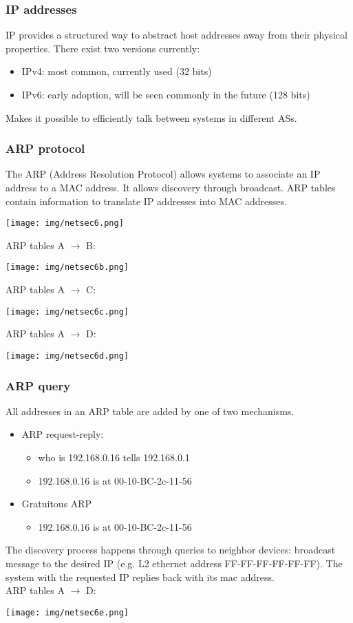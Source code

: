\documentclass[a4paper, 10pt, titlepage]{article}
\begin{document}
\subsubsection*{IP addresses}
IP provides a structured way to abstract host addresses away from their physical properties. There exist two versions currently:
\begin{itemize}
\item IPv4: most common, currently used (32 bits)
\item IPv6: early adoption, will be seen commonly in the future (128 bits)
\end{itemize}
Makes it possible to efficiently talk between systems in different ASs.

\subsubsection*{ARP protocol}
The ARP (Address Resolution Protocol) allows systems to associate an IP address to a MAC address. It allows discovery through broadcast. ARP tables contain information to translate IP addresses into MAC addresses.
\begin{center}
	\texttt{[image: img/netsec6.png]}
\end{center}
ARP tables A $\rightarrow$ B:
\begin{center}
	\texttt{[image: img/netsec6b.png]}
\end{center}
ARP tables A $\rightarrow$ C:
\begin{center}
	\texttt{[image: img/netsec6c.png]}
\end{center}
ARP tables A $\rightarrow$ D:
\begin{center}
	\texttt{[image: img/netsec6d.png]}
\end{center}

\subsubsection*{ARP query}
All addresses in an ARP table are added by one of two mechanisms.
\begin{itemize}
\item ARP request-reply:
\begin{itemize}
\item who is 192.168.0.16 tells 192.168.0.1
\item 192.168.0.16 is at 00-10-BC-2c-11-56
\end{itemize}
\item Gratuitous ARP
\begin{itemize}
\item 192.168.0.16 is at 00-10-BC-2c-11-56
\end{itemize}
\end{itemize}
The discovery process happens through queries to neighbor devices: broadcast message to the desired IP (e.g. L2 ethernet address FF-FF-FF-FF-FF-FF). The system with the requested IP replies back with its mac address. \medskip\\
ARP tables A $\rightarrow$ D:
\begin{center}
	\texttt{[image: img/netsec6e.png]}
\end{center}
\end{document}
